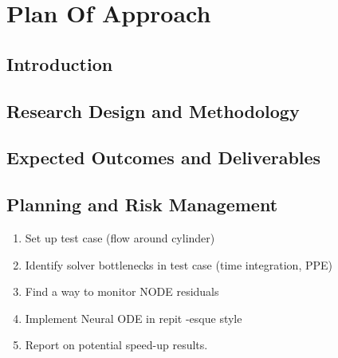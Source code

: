 \chapter{Plan Of Approach}
\label{chap: POA}

\section{Introduction}

\section{Research Design and Methodology}

\section{Expected Outcomes and Deliverables}

\section{Planning and Risk Management}

\begin{enumerate}
    \item Set up test case (flow around cylinder)
    \item Identify solver bottlenecks in test case (time integration, PPE)
    \item Find a way to monitor NODE residuals
    \item Implement Neural ODE in repit -esque style
    \item Report on potential speed-up results. 
\end{enumerate}





